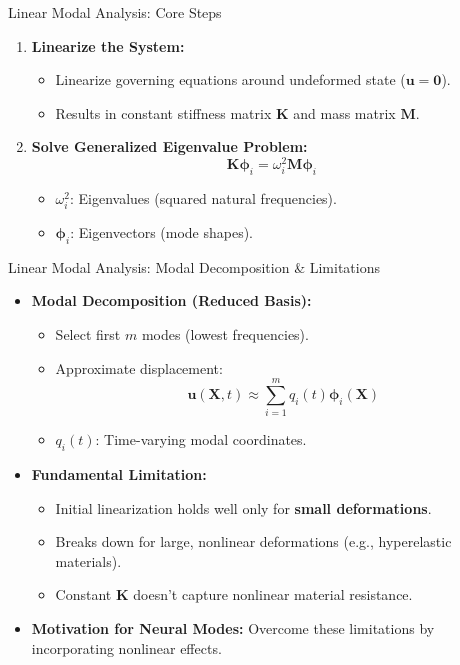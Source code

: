 \documentclass{beamer}
\begin{document}
\begin{frame}{Linear Modal Analysis: Core Steps}
    \begin{enumerate}
        \item \textbf{Linearize the System:}
        \begin{itemize}
            \item Linearize governing equations around undeformed state (\(\bm{u}=\bm{0}\)).
            \item Results in constant stiffness matrix \(\bm{K}\) and mass matrix \(\bm{M}\).
        \end{itemize}
        \item \textbf{Solve Generalized Eigenvalue Problem:}
        \begin{equation*}
            \bm{K} \bm{\phi}_i = \omega_i^2 \bm{M} \bm{\phi}_i
        \end{equation*}
        \begin{itemize}
            \item \(\omega_i^2\): Eigenvalues (squared natural frequencies).
            \item \(\bm{\phi}_i\): Eigenvectors (mode shapes).
        \end{itemize}
    \end{enumerate}
\end{frame}

\begin{frame}{Linear Modal Analysis: Modal Decomposition \& Limitations}
    \begin{itemize}
        \item \textbf{Modal Decomposition (Reduced Basis):}
        \begin{itemize}
            \item Select first \(m\) modes (lowest frequencies).
            \item Approximate displacement:
            \begin{equation*}
                \bm{u}(\bm{X},t) \approx \sum_{i=1}^{m} q_i(t) \bm{\phi}_i(\bm{X})
            \end{equation*}
            \item \(q_i(t)\): Time-varying modal coordinates.
        \end{itemize}
        \item \textbf{Fundamental Limitation:}
        \begin{itemize}
            \item Initial linearization holds well only for \textbf{small deformations}.
            \item Breaks down for large, nonlinear deformations (e.g., hyperelastic materials).
            \item Constant \(\bm{K}\) doesn't capture nonlinear material resistance.
        \end{itemize}
        \item \textbf{Motivation for Neural Modes:} Overcome these limitations by incorporating nonlinear effects.
    \end{itemize}
\end{frame}
\end{document}
